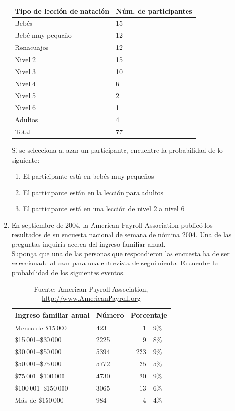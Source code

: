 \documentclass[11pt,twoside]{article}
\begin{document}
\begin{enumerate}
\begin{center}
\begin{tabular}{ll}
Tipo de lección de natación & Núm. de participantes\\ \hline
Bebés & 15\\
Bebé muy pequeño & 12\\
Renacuajos & 12\\
Nivel 2 & 15\\
Nivel 3 & 10\\
Nivel 4 & 6\\
Nivel 5 & 2\\
Nivel 6 & 1\\
Adultos & 4\\ \hline
Total & 77
\end{tabular}
\end{center}
Si se selecciona al azar un participante, encuentre la probabilidad de lo siguiente:
\begin{enumerate}
 \item El participante está en bebés muy pequeños
 \item El participante están en la lección para adultos
 \item El participante está en una lección de nivel 2 a nivel 6
\end{enumerate}
\item En septiembre de 2004, la American Payroll Association publicó los resultados de su encuesta nacional de semana de nómina 2004. Una de las preguntas inquiría acerca del ingreso familiar anual.\\
Suponga que una de las personas que respondieron las encuesta ha de ser seleccionado al azar para una entrevista de seguimiento. Encuentre la probabilidad de los siguientes eventos.
\begin{table}[h!]
\begin{center}
\begin{tabular}{llr@{.}l}
Ingreso familiar anual & Número &\multicolumn{2}{l}{Porcentaje} \\ \hline
Menos de \$15\,000 & 423 & 1&9\% \\
\$15\,001--\$30\,000 & 2225 & 9&8\%\\
\$30\,001--\$50\,000 & 5394 & 223&9\%\\
\$50\,001--\$75\,000 & 5772 & 25&5\%\\
\$75\,001--\$100\,000 & 4730 & 20&9\%\\
\$100\,001--\$150\,000 & 3065 & 13&6\%\\
Más de \$150\,000 & 984 & 4&4\% \\\hline
\end{tabular}\caption{Fuente: American Payroll Association, \url{http://www.AmericanPayroll.org}}
\end{center}
            \end{table} 


\end{enumerate}
\end{document}
